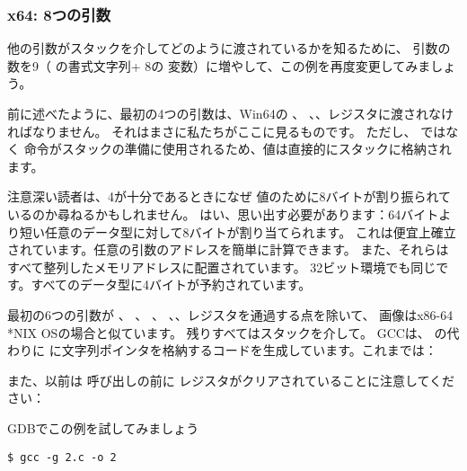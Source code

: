 \subsubsection{x64: 8つの引数}

\label{example_printf8_x64}
他の引数がスタックを介してどのように渡されているかを知るために、
引数の数を9（ \printf の書式文字列+ 8の \Tint 変数）に増やして、この例を再度変更してみましょう。




前に述べたように、最初の4つの引数は、Win64の \RCX 、 \RDX 、、レジスタに渡されなければなりません。 
それはまさに私たちがここに見るものです。 
ただし、 \PUSH ではなく \MOV 命令がスタックの準備に使用されるため、値は直接的にスタックに格納されます。



注意深い読者は、4が十分であるときになぜ \Tint 値のために8バイトが割り振られているのか尋ねるかもしれません。
はい、思い出す必要があります：64バイトより短い任意のデータ型に対して8バイトが割り当てられます。 
これは便宜上確立されています。任意の引数のアドレスを簡単に計算できます。 
また、それらはすべて整列したメモリアドレスに配置されています。 
32ビット環境でも同じです。すべてのデータ型に4バイトが予約されています。



最初の6つの引数が \RDI 、 \RSI 、 \RDX 、 \RCX 、、レジスタを通過する点を除いて、
画像はx86-64 *NIX OSの場合と似ています。 
残りすべてはスタックを介して。
GCCは、 \RDI{} の代わりに \EDI に文字列ポインタを格納するコードを生成しています。これまでは：

また、以前は \printf 呼び出しの前に \EAX レジスタがクリアされていることに注意してください：




\ac{GDB}でこの例を試してみましょう

\begin{lstlisting}
$ gcc -g 2.c -o 2
\end{lstlisting}

